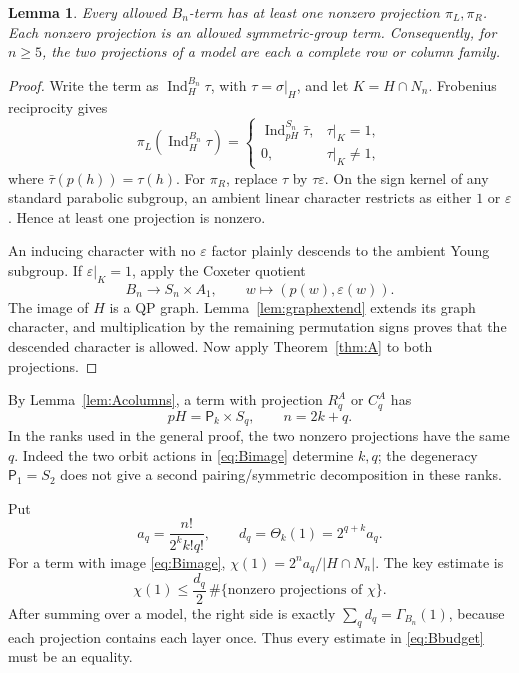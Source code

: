 \documentclass[11pt]{article}
\numberwithin{equation}{section}
\newtheorem{lemma}[theorem]{Lemma}
\theoremstyle{definition}
\DeclareMathOperator{\Ind}{Ind}
\newcommand{\ee}{\varepsilon}
\newcommand{\pair}{\mathsf P}
\begin{document}
\begin{lemma}\label{lem:Bprojection}
Every allowed \(B_n\)-term has at least one nonzero projection \(\pi_L,\pi_R\).
Each nonzero projection is an allowed symmetric-group term.
Consequently, for \(n\geq5\), the two projections of a model are each a complete row or column family.
\end{lemma}
\begin{proof}
Write the term as \(\Ind_H^{B_n}\tau\), with \(\tau=\sigma|_H\), and let \(K=H\cap N_n\).
Frobenius reciprocity gives
\[
 \pi_L(\Ind_H^{B_n}\tau)=
 \begin{cases}
 \Ind_{pH}^{S_n}\bar\tau,&\tau|_K=1,\\
 0,&\tau|_K\ne1,
 \end{cases}
\]
where \(\bar\tau(p(h))=\tau(h)\).
For \(\pi_R\), replace \(\tau\) by \(\tau\ee\).
On the sign kernel of any standard parabolic subgroup, an ambient linear character restricts as either \(1\) or \(\ee\).
Hence at least one projection is nonzero.

An inducing character with no \(\ee\) factor plainly descends to the ambient Young subgroup.
If \(\ee|_K=1\), apply the Coxeter quotient
\[
 B_n\longrightarrow S_n\times A_1,\qquad w\longmapsto(p(w),\ee(w)).
\]
The image of \(H\) is a QP graph.
Lemma~\ref{lem:graphextend} extends its graph character, and multiplication by the remaining permutation signs proves that the descended character is allowed.
Now apply Theorem~\ref{thm:A} to both projections.
\end{proof}

By Lemma~\ref{lem:Acolumns}, a term with projection \(R_q^A\) or \(C_q^A\) has
\begin{equation}
 pH=\pair_k\times S_q,\qquad n=2k+q .
 \label{eq:Bimage}
\end{equation}
In the ranks used in the general proof, the two nonzero projections have the same \(q\).
Indeed the two orbit actions in \eqref{eq:Bimage} determine \(k,q\); the degeneracy \(\pair_1=S_2\) does not give a second pairing/symmetric decomposition in these ranks.

Put
\[
 a_q=\frac{n!}{2^kk!q!},\qquad
 d_q=\Theta_k(1)=2^{q+k}a_q .
\]
For a term with image \eqref{eq:Bimage},
\(\chi(1)=2^na_q/|H\cap N_n|\).
The key estimate is
\begin{equation}
 \chi(1)\leq\frac{d_q}{2}\,
       \#\{\text{nonzero projections of }\chi\}.
 \label{eq:Bbudget}
\end{equation}
After summing over a model, the right side is exactly \(\sum_qd_q=\Gamma_{B_n}(1)\), because each projection contains each layer once.
Thus every estimate in \eqref{eq:Bbudget} must be an equality.
\end{document}
